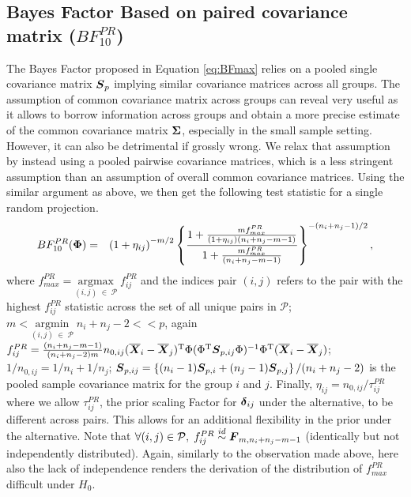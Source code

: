 \documentclass[times,sort&compress,3p]{elsarticle}
\theoremstyle{plain}%
\theoremstyle{definition}
\def\be{\begin{eqnarray}}
\def\ee{\end{eqnarray}}
\def\trans{^{\rm T}}
\newcommand{\uF}       {\mbox{\boldmath$F$}}
\newcommand{\uS}       {\mbox{\boldmath$S$}}
\newcommand{\uX}       {\mbox{\boldmath$X$}}
\newcommand{\udelta}            {\mbox{\boldmath$\delta$}}
\newcommand{\uSigma}            {\mbox{\boldmath$\Sigma$}}
\newcommand{\uPhi}              {\mbox{\boldmath$\Phi$}}
\begin{document}
\subsection{Bayes Factor Based on paired covariance matrix ($BF^{PR}_{10}$)} \label{sec:testid}
The Bayes Factor proposed in Equation \ref{eq:BFmax} relies on a pooled single covariance matrix $\uS_p$ implying similar covariance matrices across all groups. The assumption of common covariance matrix across groups can reveal very useful as it allows to borrow information across groups and obtain a more precise estimate of the common covariance matrix $\uSigma$, especially in the small sample setting. However, it can also be detrimental if grossly wrong. We relax that assumption by instead using a pooled pairwise covariance matrices, which is a less stringent assumption than an assumption of overall common covariance matrices. Using the similar argument as above, we then get the following test statistic for a single random projection.
\be
BF^{PR}_{10}(\uPhi) &=& \left(1 + \eta_{ij} \right)^{-m/2} \left\{ \frac{1 + \frac{m f^{PR}_{max}}{(1 + \eta_{ij})(n_{i}+n_{j}-m-1)}}{ 1 + \frac{m f^{PR}_{max}}{(n_{i}+n_{j}-m-1)}  } \right\}^{-(n_{i}+n_{j}-1)/2}, \label{eq:BFmaxij}
\ee
where $f^{PR}_{max} = \underset{(i,j)\; \in\; \mathcal{P}}{\mathrm{argmax}}\;f^{PR}_{ij}$ and the indices pair $(i,j)$ refers to the pair with the highest $f^{PR}_{ij}$ statistic across the set of all unique pairs in $\mathcal{P}$; $m < \underset{(i,j)\; \in\; \mathcal{P}}{\mathrm{argmin}}\; n_{i}+n_{j} - 2 << p$, again $f^{PR}_{ij}  = \frac{(n_{i}+n_{j} - m - 1)}{(n_{i}+n_{j} -2)m} n_{0,ij} (\overline{\uX}_i - \overline{\uX}_j)\trans\Phi (\Phi\trans\uS_{p,ij}\Phi)^{-1}\Phi\trans(\overline{\uX}_i - \overline{\uX}_j)$;
$1/n_{0,ij} = 1/n_i + 1/n_j$; $\uS_{p,ij} =\left\{ (n_{i}-1)\uS_{p,i} + (n_{j}-1)\uS_{p,j} \right\}/(n_{i} + n_{j} -2)$ is the pooled sample covariance matrix for the group $i$ and $j$. Finally, $\eta_{ij} = n_{0,ij} /\tau^{PR}_{ij}$ where we allow $\tau^{PR}_{ij}$, the prior scaling Factor for $\udelta_{ij}$ under the alternative, to be different across pairs. This allows for an additional flexibility in the prior under the alternative.  
Note that $\forall (i,j) \in \mathcal{P}, \; f^{PR}_{ij} \stackrel{id}{\sim} \uF_{m, n_{i}+n_{j} - m- 1}$ (identically but not independently distributed). Again, similarly to the observation made above, here also the lack of independence renders the derivation of the distribution of $f^{PR}_{max}$ difficult under $H_0$. %
\end{document}
